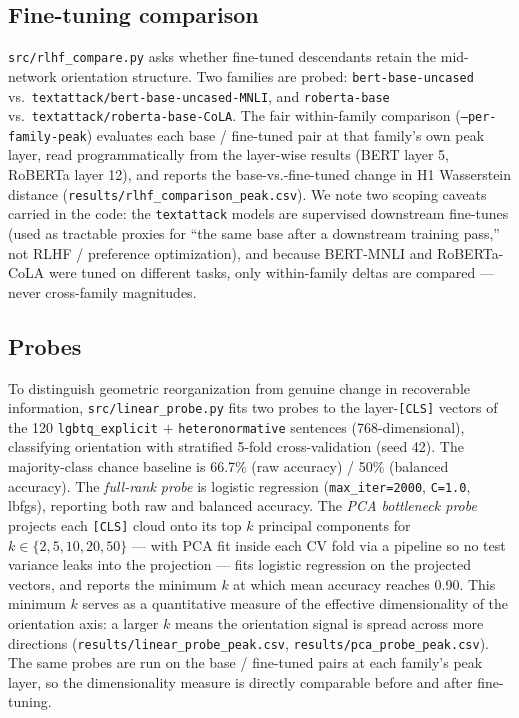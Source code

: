 \documentclass[11pt]{article}
\begin{document}
\subsection{Fine-tuning comparison}

\texttt{src/rlhf\_compare.py} asks whether fine-tuned descendants retain the mid-network orientation structure. Two families are probed: \texttt{bert-base-uncased} vs.\ \texttt{textattack/bert-base-uncased-MNLI}, and \texttt{roberta-base} vs.\ \texttt{textattack/roberta-base-CoLA}. The fair within-family comparison (\texttt{--per-family-peak}) evaluates each base / fine-tuned pair at that family's own peak layer, read programmatically from the layer-wise results (BERT layer 5, RoBERTa layer 12), and reports the base-vs.-fine-tuned change in H1 Wasserstein distance (\texttt{results/rlhf\_comparison\_peak.csv}). We note two scoping caveats carried in the code: the \texttt{textattack} models are supervised downstream fine-tunes (used as tractable proxies for ``the same base after a downstream training pass,'' not RLHF / preference optimization), and because BERT-MNLI and RoBERTa-CoLA were tuned on different tasks, only within-family deltas are compared --- never cross-family magnitudes.

\subsection{Probes}\label{sec:probes_methods}

To distinguish geometric reorganization from genuine change in recoverable information, \texttt{src/linear\_probe.py} fits two probes to the layer-\texttt{[CLS]} vectors of the 120 \texttt{lgbtq\_explicit} $+$ \texttt{heteronormative} sentences (768-dimensional), classifying orientation with stratified 5-fold cross-validation (seed 42). The majority-class chance baseline is 66.7\% (raw accuracy) / 50\% (balanced accuracy). The \textit{full-rank probe} is logistic regression (\texttt{max\_iter=2000}, \texttt{C=1.0}, lbfgs), reporting both raw and balanced accuracy. The \textit{PCA bottleneck probe} projects each \texttt{[CLS]} cloud onto its top $k$ principal components for $k \in \{2, 5, 10, 20, 50\}$ --- with PCA fit inside each CV fold via a pipeline so no test variance leaks into the projection --- fits logistic regression on the projected vectors, and reports the minimum $k$ at which mean accuracy reaches 0.90. This minimum $k$ serves as a quantitative measure of the effective dimensionality of the orientation axis: a larger $k$ means the orientation signal is spread across more directions (\texttt{results/linear\_probe\_peak.csv}, \texttt{results/pca\_probe\_peak.csv}). The same probes are run on the base / fine-tuned pairs at each family's peak layer, so the dimensionality measure is directly comparable before and after fine-tuning.
\end{document}
